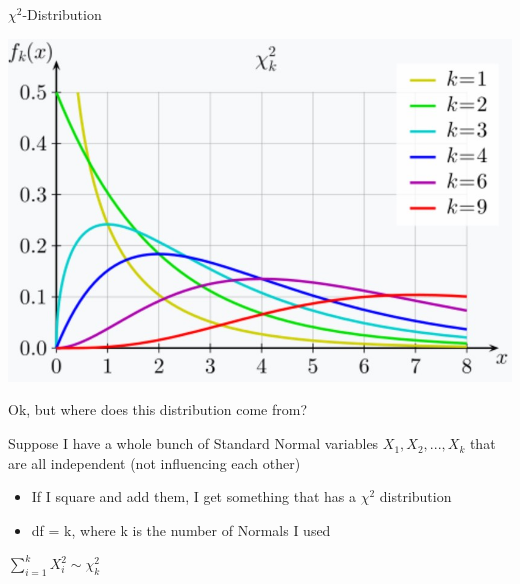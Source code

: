 \documentclass{beamer}
\begin{document}
\begin{frame}{$\chi^2$-Distribution}
\begin{center}
    \includegraphics[scale=.3]{img/chi2_distr.jpg}
\end{center}
Ok, but where does this distribution come from? \vspace{4mm}

Suppose I have a whole bunch of Standard Normal variables $X_1, X_2, ... , X_k$ that are all independent (not influencing each other)
\begin{itemize}
    \item If I square and add them, I get something that has a $\chi^2$ distribution
    \item df = k, where k is the number of Normals I used
\end{itemize} \vspace{4mm}
\begin{center}
$\sum_{i=1}^k X_i^2 \sim \chi^2_{k}$
\end{center}
\end{frame}
\end{document}
